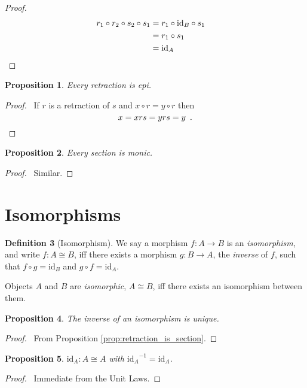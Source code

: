 \documentclass{book}
\let\qed\relax
\newtheorem{prop}{Proposition}[chapter]
\theoremstyle{definition}
\newtheorem{df}[prop]{Definition}
\newcommand{\id}[1]{\ensuremath{\mathrm{id}_{#1}}}
\begin{document}
\begin{proof}
\pf
\begin{align*}
r_1 \circ r_2 \circ s_2 \circ s_1 & = r_1 \circ \id{B} \circ s_1 \\
& = r_1 \circ s_1 \\
& = \id{A} & \qed
\end{align*}
\end{proof}

\begin{prop}
Every retraction is epi.
\end{prop}

\begin{proof}
\pf\ If $r$ is a retraction of $s$ and $x \circ r = y \circ r$ then
\[ x = xrs = yrs = y \enspace .  \qed \]
\end{proof}

\begin{prop}
Every section is monic.
\end{prop}

\begin{proof}
\pf\ Similar. \qed
\end{proof}

\section{Isomorphisms}

\begin{df}[Isomorphism]
We say a morphism $f : A \rightarrow B$ is an \emph{isomorphism}, and write $f : A \cong B$, iff there exists a morphism $g : B \rightarrow A$, the \emph{inverse} of $f$, such that $f \circ g = \id{B}$ and $g \circ f = \id{A}$.

Objects $A$ and $B$ are \emph{isomorphic}, $A \cong B$, iff there exists an isomorphism between them.
\end{df}

\begin{prop}
The inverse of an isomorphism is unique.
\end{prop}

\begin{proof}
\pf\ From Proposition \ref{prop:retraction_is_section}. \qed
\end{proof}

\begin{prop}
$\id{A} : A \cong A$ with $\id{A}^{-1} = \id{A}$.
\end{prop}

\begin{proof}
\pf\ Immediate from the Unit Laws. \qed
\end{proof}
\end{document}
